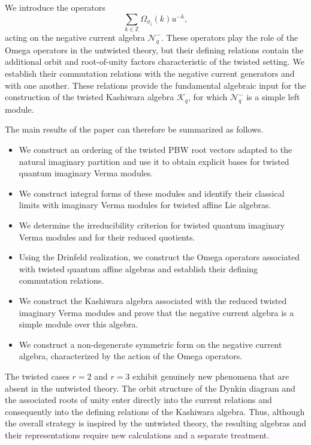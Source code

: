 \documentclass[12pt]{amsart}
\numberwithin{equation}{section}
\begin{document}
We introduce the operators
\[
\sum_{k\in\mathbb Z}\Omega_{\phi_i}(k)u^{-k},
\]
acting on the negative current algebra $\mathcal N_q^-$. These operators play the role of the Omega operators in the untwisted theory, but their defining relations contain the additional orbit and root-of-unity factors characteristic of the twisted setting. We establish their commutation relations with the negative current generators and with one another. These relations provide the fundamental algebraic input for the construction of the twisted Kashiwara algebra $\mathcal K_q$, for which $\mathcal N_q^-$ is a simple left module.

The main results of the paper can therefore be summarized as follows.

\begin{itemize}
\item We construct an ordering of the twisted PBW root vectors adapted to the natural imaginary partition and use it to obtain explicit bases for twisted quantum imaginary Verma modules.

\item We construct integral forms of these modules and identify their classical limits with imaginary Verma modules for twisted affine Lie algebras.

\item We determine the irreducibility criterion for twisted quantum imaginary Verma modules and for their reduced quotients.

\item Using the Drinfeld realization, we construct the Omega operators associated with twisted quantum affine algebras and establish their defining commutation relations.

\item We construct the Kashiwara algebra associated with the reduced twisted imaginary Verma modules and prove that the negative current algebra is a simple module over this algebra.

\item We construct a non-degenerate symmetric form on the negative current algebra, characterized by the action of the Omega operators.
\end{itemize}

The twisted cases $r=2$ and $r=3$ exhibit genuinely new phenomena that are absent in the untwisted theory. The orbit structure of the Dynkin diagram and the associated roots of unity enter directly into the current relations and consequently into the defining relations of the Kashiwara algebra. Thus, although the overall strategy is inspired by the untwisted theory, the resulting algebras and their representations require new calculations and a separate treatment.
\end{document}
